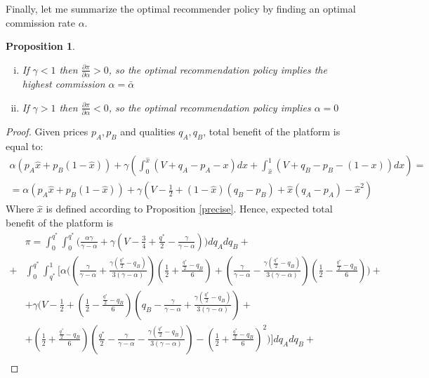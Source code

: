 \documentclass[a4paper]{article}
\newtheorem{proposition}[theorem]{Proposition}
\begin{document}
Finally, let me summarize the optimal recommender policy by finding an optimal commission rate $\alpha$.
\begin{proposition}\label{opt_alpha}
	\begin{enumerate}[(i)]
		\item If $\gamma < 1$ then $\frac{\partial \pi}{\partial \alpha} > 0$, so the optimal recommendation policy implies the highest commission $\alpha = \bar{\alpha}$
		\item If $\gamma > 1$ then $\frac{\partial \pi}{\partial \alpha} < 0$, so the optimal recommendation policy implies $\alpha = 0$
	\end{enumerate}
\end{proposition}
\begin{proof} Given prices $p_A, p_B$ and qualities $q_A, q_B$, total benefit of the platform is equal to:
	\begin{align*}
	\alpha(p_A \hat{x} + p_B(1-\hat{x})) + \gamma \left(\int_{0}^{\hat{x}} (V + q_A - p_A - x)dx + \int_{\hat{x}}^1 (V + q_B - p_B -(1-x))dx\right) = \\
	= 	\alpha(p_A \hat{x} + p_B(1-\hat{x})) + \gamma \left(V - \frac{1}{2}+(1-\hat{x})(q_B - p_B) + \hat{x}(q_A-p_A) - \hat{x}^2  \right)
	\end{align*}
	Where $\hat{x}$ is defined according to Proposition \ref{precise}. Hence, expected total benefit of the platform is
	\begin{align*}
	&\pi = \int_{0}^{q^*} \int_0^{q^*} \biggl( \frac{\alpha \gamma}{\gamma - \alpha} + \gamma \left(V - \frac{3}{4}+ \frac{q^*}{2} - \frac{\gamma}{\gamma - \alpha} \right)\biggr) dq_A dq_B +\\+
	 &\int_0^{q^*} \int_{q^*}^1 \biggl[ \alpha \biggl( \left( \frac{\gamma}{\gamma - \alpha} + \frac{\gamma\left( \frac{q^*}{2} - q_B \right) }{3(\gamma - \alpha)} \right)\left(\frac{1}{2} + \frac{\frac{q^*}{2} - q_B}{6} \right) + \left( \frac{\gamma}{\gamma - \alpha} - \frac{\gamma\left( \frac{q^*}{2} - q_B \right) }{3(\gamma - \alpha)} \right)\left(\frac{1}{2} - \frac{\frac{q^*}{2} - q_B}{6} \right) \biggr)+\\
	 &+\gamma \biggl(V - \frac{1}{2} + \left(\frac{1}{2} - \frac{\frac{q^*}{2} - q_B}{6} \right) \left( q_B - \frac{\gamma}{\gamma - \alpha} + \frac{\gamma \left( \frac{q^*}{2} - q_B \right)}{3 (\gamma - \alpha)} \right)  + \\
	 &+ \left(\frac{1}{2} + \frac{\frac{q^*}{2} - q_B}{6} \right) \left(\frac{q^*}{2} - \frac{\gamma}{\gamma - \alpha} - \frac{\gamma \left( \frac{q^*}{2} - q_B \right)}{3(\gamma - \alpha)} \right)  - \left( \frac{1}{2} + \frac{\frac{q^*}{2} - q_B}{6} \right)^2 \biggr)  \biggr] dq_A dq_B +\\

\end{align*}
\end{proof}
\end{document}
